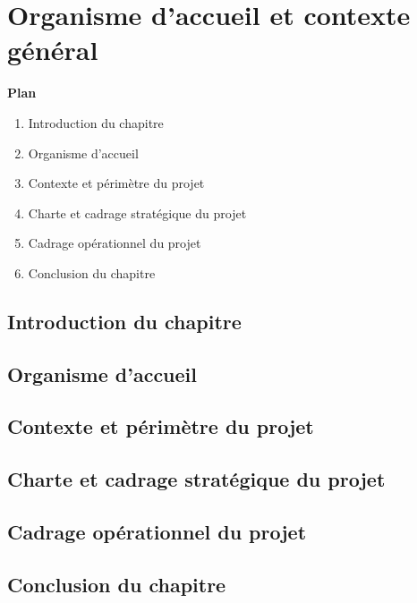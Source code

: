 ﻿\chapter{Organisme d’accueil et contexte général} 
\label{chap:organisme_contexte}
\thispagestyle{noheaderpagenum}

{
    \setlength{\parindent}{0pt}
    \Large\textbf{Plan}
    \vspace{0.5cm}
    
    \renewcommand{\labelenumi}{\textbf{\arabic{enumi}.}}
    \begin{enumerate}[leftmargin=1.5cm, labelsep=0.5cm, itemsep=0.3cm]
        \item Introduction du chapitre \dotfill \pageref{sec:c1_intro}
        \item Organisme d'accueil \dotfill \pageref{sec:c1_organisme}
        \item Contexte et périmètre du projet \dotfill \pageref{sec:c1_contexte}
        \item Charte et cadrage stratégique du projet \dotfill \pageref{sec:c1_charte}
        \item Cadrage opérationnel du projet \dotfill \pageref{sec:c1_cadrage}
        \item Conclusion du chapitre \dotfill \pageref{sec:c1_conclusion}
    \end{enumerate}
}
\clearpage
\thispagestyle{fancy}

\section{Introduction du chapitre}\label{sec:c1_intro}
\lipsum[1][1-2]

\section{Organisme d'accueil}\label{sec:c1_organisme}
\lipsum[1][1-2]

\section{Contexte et périmètre du projet}\label{sec:c1_contexte}
\lipsum[1][1-2]

\section{Charte et cadrage stratégique du projet}\label{sec:c1_charte}
\lipsum[1][1-2]
\section{Cadrage opérationnel du projet}\label{sec:c1_cadrage}
\lipsum[1][1-2]

\section{Conclusion du chapitre}\label{sec:c1_conclusion}
\lipsum[1][1-2]
